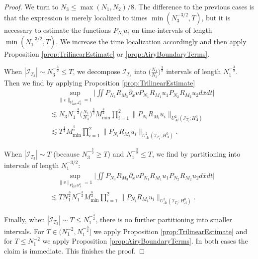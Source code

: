 \documentclass{amsart}
\theoremstyle{definition}
\begin{document}
\begin{proof}
We turn to  $N_3 \leq \max( N_1,N_2)/8$. The difference to the previous cases is that the expression is merely localized to times $\min(N_3^{-3/2},T)$, but it is necessary to estimate the functions $P_{N_i} u_i$ on time-intervals of length $\min(N_1^{-3/2},T)$. We increase the time localization accordingly and then apply Proposition \ref{prop:TrilinearEstimate} or \ref{prop:AiryBoundaryTerms}. 

When $|\mathcal{I}_{T_3}| \sim N_3^{-\frac{3}{2}} \leq T$, we decompose $\mathcal{I}_{T_3}$ into $\big( \frac{N_1}{N_3} \big)^{\frac{3}{2}}$ intervals of length $N_1^{-\frac{3}{2}}$. Then we find by applying Proposition \ref{prop:TrilinearEstimate}
\begin{equation*}
\begin{split}
&\quad \sup_{\| v \|_{V^2_{KdV} \mathcal{L}^2_x} = 1} \big| \iint P_{N_3} R_{M_3} \partial_x v P_{N_1} R_{M_1} u_1 P_{N_2} R_{M_2} u_2 d\overline{x} dt \big| \\
&\lesssim N_3 N_1^{-\frac{3}{2}} \big( \frac{N_1}{N_3} \big)^{\frac{3}{2}} M_{\min}^{\frac{b}{2}} \prod_{i=1}^2 \| P_{N_i} R_{M_i} u_i \|_{U^2_{Ai}(\mathcal{I}_{T_i}; H^0_\Lambda)} \\
&\lesssim T^{\frac{1}{4}} M_{\min}^{\frac{b}{2}} \prod_{i=1}^2 \| P_{N_i} R_{M_i} u_i \|_{U^2_{Ai}(\mathcal{I}_{T_i}; H^0_\Lambda)}.
\end{split}
\end{equation*}

When $|\mathcal{I}_{T_3}| \sim T$ (because $N_3^{-\frac{3}{2}} \geq T$) and $N_1^{-\frac{3}{2}} \leq T$, we find by partitioning into intervals of length $N_1^{-3/2}$:
\begin{equation*}
\begin{split}
&\quad \sup_{\| v \|_{V^2_{KdV} H^0_\Lambda} = 1} \big| \iint P_{N_3} R_{M_3} \partial_x v P_{N_1} R_{M_1} u_1 P_{N_2} R_{M_2} u_2 d\overline{x} dt \big| \\
&\lesssim T N_1^{\frac{3}{2}} N_1^{-\frac{3}{2}} M_{\min}^{\frac{b}{2}} \prod_{i=1}^2 \| P_{N_i} R_{M_i} u_i \|_{U^2_{Ai}(\mathcal{I}_{T_i}; H^0_\Lambda)}.
\end{split}
\end{equation*}

Finally, when $|\mathcal{I}_{T_3}| \sim T \leq N_1^{-\frac{3}{2}}$, there is no further partitioning into smaller intervals. For $T \in (N_1^{-2},N_1^{-\frac{3}{2}}]$ we apply Proposition \ref{prop:TrilinearEstimate} and for $T \leq N_1^{-2}$ we apply Proposition \ref{prop:AiryBoundaryTerms}. In both cases the claim is immediate.
This finishes the proof.
\end{proof}
\end{document}
